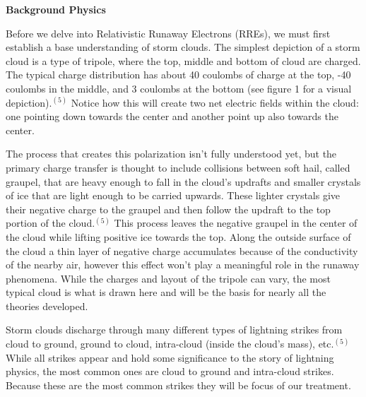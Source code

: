 \documentclass[11pt]{article}
\begin{document}
\begin{multicols*}{2}
    \noindent
{\bf \LARGE Background Physics}

    Before we delve into Relativistic Runaway Electrons (RREs), we must first establish a base understanding of storm clouds. The simplest depiction of a storm cloud is a type of tripole, where the top, middle and bottom of cloud are charged. The typical charge distribution has about 40 coulombs of charge at the top, -40 coulombs in the middle, and 3 coulombs at the bottom (see figure 1 for a visual depiction).$^{(5)}$ Notice how this will create two net electric fields within the cloud: one pointing down towards the center and another point up also towards the center. 
    
    The process that creates this polarization isn't fully understood yet, but the primary charge transfer is thought to include collisions between soft hail, called graupel, that are heavy enough to fall in the cloud's updrafts and smaller crystals of ice that are light enough to be carried upwards. These lighter crystals give their negative charge to the graupel and then follow the updraft to the top portion of the cloud.$^{(5)}$ This process leaves the negative graupel in the center of the cloud while lifting positive ice towards the top. Along the outside surface of the cloud a thin layer of negative charge accumulates because of the conductivity of the nearby air, however this effect won't play a meaningful role in the runaway phenomena. While the charges and layout of the tripole can vary, the most typical cloud is what is drawn here and will be the basis for nearly all the theories developed. 
    
    Storm clouds discharge through many different types of lightning strikes from cloud to ground, ground to cloud, intra-cloud (inside the cloud's mass), etc.$^{(5)}$ While all strikes appear and hold some significance to the story of lightning physics, the most common ones are cloud to ground and intra-cloud strikes. Because these are the most common strikes they will be focus of our treatment.


\end{multicols*}
\end{document}
